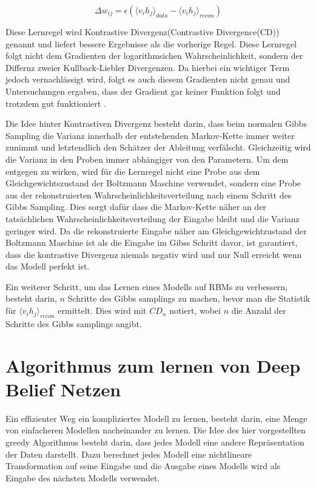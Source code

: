 \documentclass[12pt]{article}
\begin{document}
\begin{equation}
\Delta w_{ij} = \epsilon \left( \langle v_i h_j\rangle_{data} - \langle v_i h_j \rangle_{recon}\right)
\end{equation}

Diese Lernregel wird Kontrastive Divergenz(Contrastive Divergence(CD)) genannt und liefert bessere Ergebnisse als die vorherige Regel. Diese Lernregel folgt nicht dem Gradienten der logarithmsichen Wahrscheinlichkeit, sondern der Differnz zweier Kullback-Liebler Divergenzen. Da hierbei ein wichtiger Term jedoch vernachlässigt wird, folgt es auch diesem Gradienten nicht genau und Untersuchungen ergaben, dass der Gradient gar keiner Funktion folgt und trotzdem gut funktioniert \cite{noconv}. 

Die Idee hinter Kontrastiven Divergenz besteht darin, dass beim normalen Gibbs Sampling die Varianz innerhalb der entstehenden Markov-Kette immer weiter zunimmt und letztendlich den Schätzer der Ableitung verfälscht. Gleichzeitig wird die Varianz in den Proben immer abhängiger von den Parametern. Um dem entgegen zu wirken, wird für die Lernregel nicht eine Probe aus dem Gleichgewichtszustand der Boltzmann Maschine verwendet, sondern eine Probe aus der rekonstruierten Wahrscheinlichkeitsverteilung nach einem Schritt des Gibbs Sampling. Dies sorgt dafür dass die Markov-Kette näher an der tatsächlichen Wahrscheinlichkeitsverteilung der Eingabe bleibt und die Varianz geringer wird. Da die rekonstruierte Eingabe näher am Gleichgewichtzustand der Boltzmann Maschine ist als die Eingabe im Gibss Schritt davor, ist garantiert, dass die kontrastive Divergenz niemals negativ wird und nur Null erreicht wenn das Modell perfekt ist. \cite{digits}

Ein weiterer Schritt, um das Lernen eines Modells auf RBMs zu verbessern, besteht darin, $n$ Schritte des Gibbs samplings zu machen, bevor man die Statistik für $\langle v_i h_j \rangle_{recon}$ ermittelt. Dies wird mit $CD_n$ notiert, wobei $n$ die Anzahl der Schritte des Gibbs samplings angibt.

\section{Algorithmus zum lernen von Deep Belief Netzen}
Ein effizienter Weg ein kompliziertes Modell zu lernen, besteht darin, eine Menge von einfacheren Modellen nacheinander zu lernen. Die Idee des hier vorgestellten greedy Algorithmus besteht darin, dass jedes Modell eine andere Repräsentation der Daten darstellt. Dazu berechnet jedes Modell eine nichtlineare Transformation auf seine Eingabe und die Ausgabe eines Modells wird als Eingabe des nächsten Modells verwendet. 
\end{document}
